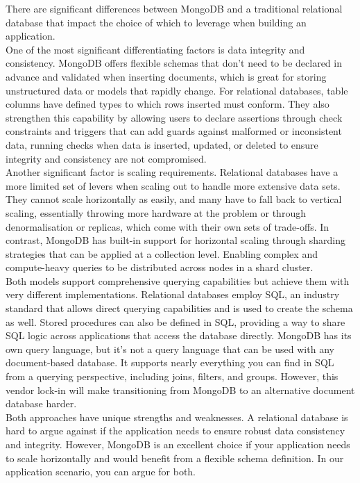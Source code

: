 \documentclass{article}
\begin{document}
There are significant differences between MongoDB and a traditional relational database that impact the choice of which to leverage when building an application.\\
\newline
One of the most significant differentiating factors is data integrity and consistency. MongoDB offers flexible schemas that don't need to be declared in advance and validated when inserting documents, which is great for storing unstructured data or models that rapidly change. For relational databases, table columns have defined types to which rows inserted must conform. They also strengthen this capability by allowing users to declare assertions through check constraints and triggers that can add guards against malformed or inconsistent data, running checks when data is inserted, updated, or deleted to ensure integrity and consistency are not compromised. \\
\newline
Another significant factor is scaling requirements. Relational databases have a more limited set of levers when scaling out to handle more extensive data sets. They cannot scale horizontally as easily, and many have to fall back to vertical scaling, essentially throwing more hardware at the problem or through denormalisation or replicas, which come with their own sets of trade-offs. In contrast, MongoDB has built-in support for horizontal scaling through sharding strategies that can be applied at a collection level. Enabling complex and compute-heavy queries to be distributed across nodes in a shard cluster. \\
\newline
Both models support comprehensive querying capabilities but achieve them with very different implementations. Relational databases employ SQL, an industry standard that allows direct querying capabilities and is used to create the schema as well. Stored procedures can also be defined in SQL, providing a way to share SQL logic across applications that access the database directly. MongoDB has its own query language, but it's not a query language that can be used with any document-based database. It supports nearly everything you can find in SQL from a querying perspective, including joins, filters, and groups. However, this vendor lock-in will make transitioning from MongoDB to an alternative document database harder. \\
\newline
Both approaches have unique strengths and weaknesses. A relational database is hard to argue against if the application needs to ensure robust data consistency and integrity. However, MongoDB is an excellent choice if your application needs to scale horizontally and would benefit from a flexible schema definition. In our application scenario, you can argue for both. \\
\end{document}
